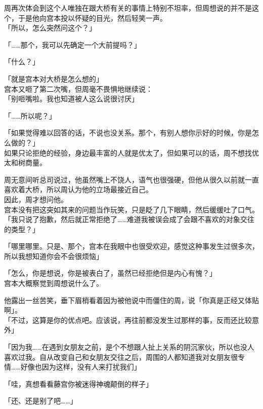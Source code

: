 周再次体会到这个人唯独在跟大桥有关的事情上特别不坦率，但周想说的并不是这个，于是他向宫本投以怀疑的目光，然后轻笑一声。\\

「所以，怎么突然问这个？」

「……那个，我可以先确定一个大前提吗？」

「什么？」

「就是宫本对大桥是怎么想的」\\

宫本又咂了第二次嘴，但周毫不畏惧地继续说：\\

「别咂嘴啦。我也知道被人这么说很讨厌」

「……所以呢？」

「如果觉得难以回答的话，不说也没关系。那个，有别人想你示好的时候，你是怎么做的？」\\

如果只论拒绝的经验，身边最丰富的人就是优太了，但如果可以的话，周不想找优太和树商量。

周无意间听总司说过，他虽然嘴上不饶人，语气也很强硬，但他从很久以前就一直喜欢着大桥，所以周认为他的立场最接近自己。\\

因此，周才想问他。\\

宫本没有把这突如其来的问题当作玩笑，只是眨了几下眼睛，然后缓缓吐了口气。\\

「我只说了抱歉，然后就正常拒绝了……难道我被误会成了会跟不喜欢的对象交往的类型？」

「哪里哪里。只是、那个，宫本在我眼中也很受欢迎，感觉这种事发生过很多次，所以我想知道你会不会很烦恼」

「怎么，你是想说，你是被表白了，虽然已经拒绝但是内心有愧？」\\

宫本大概察觉到周想说什么了。

他露出一丝苦笑，垂下眉梢看着因为被他说中而僵住的周，说「你真是正经又体贴啊」。\\

「不过，这算是你的优点吧。应该说，再往前都没发生过那样的事，反而还比较意外」

「因为我……在遇到女朋友之前，是个不想跟人扯上关系的阴沉家伙，所以也没人喜欢过我。自从改变自己和女朋友交往之后，周围的人都知道我对女朋友很专情……好像也因为这样，没有人来打扰我们」

「哇，真想看看藤宫你被迷得神魂颠倒的样子」

「还、还是别了吧……」

